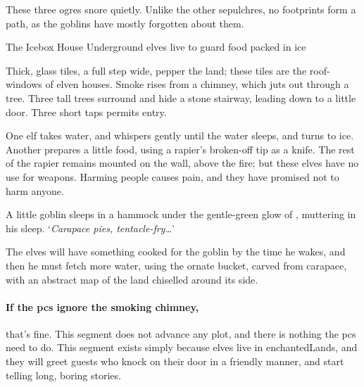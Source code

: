 These three \glspl{ogre} snore quietly.
Unlike the other \glspl{sepulchre}, no footprints form a path, as the goblins have mostly forgotten about them.

{The Icebox House}%
{Underground elves live to guard food packed in ice}%
\label{iceboxHouse}


Thick, glass tiles, a full step wide, pepper the land; these tiles are the roof-windows of elven houses.%
Smoke rises from a chimney, which juts out through a tree.
Three tall trees surround and hide a stone stairway, leading down to a little door.
Three short taps permits entry.

\begin{boxtext}
  One elf takes water, and whispers gently until the water sleeps, and turns to ice.
  Another prepares a little food, using a rapier's broken-off tip as a knife.
  The rest of the rapier remains mounted on the wall, above the fire; but these elves have no use for weapons.
  Harming people causes pain, and they have promised not to harm anyone.

  A little goblin sleeps in a hammock under the gentle-green glow of , muttering in his sleep.
  `\textit{Carapace pies, tentacle-fry\ldots}'
\end{boxtext}

The elves will have something cooked for the goblin by the time he wakes, and then he must fetch more water, using the ornate bucket, carved from carapace, with an abstract map of the land chiselled around its side.

\elf

\paragraph{If the \glspl{pc} ignore the smoking chimney,}
that's fine.
This \gls{segment} does not advance any plot, and there is nothing the \glspl{pc} need to do.
This \gls{segment} exists simply because elves live in \gls{enchantedLands}, and they will greet guests who knock on their door in a friendly manner, and start telling long, boring stories.

